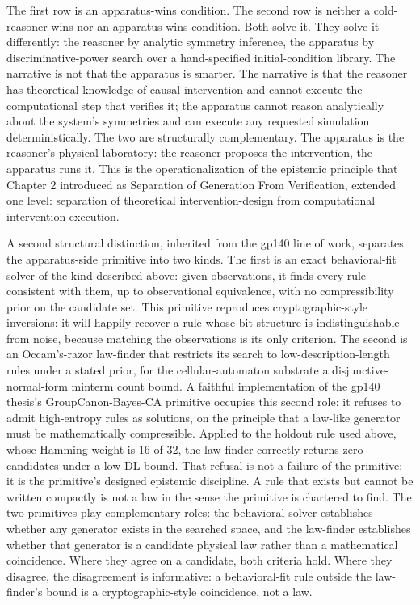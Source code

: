 \documentclass[11pt]{article}
\begin{document}
The first row is an apparatus-wins condition. The second row is neither a cold-reasoner-wins nor an apparatus-wins condition. Both solve it. They solve it differently: the reasoner by analytic symmetry inference, the apparatus by discriminative-power search over a hand-specified initial-condition library. The narrative is not that the apparatus is smarter. The narrative is that the reasoner has theoretical knowledge of causal intervention and cannot execute the computational step that verifies it; the apparatus cannot reason analytically about the system's symmetries and can execute any requested simulation deterministically. The two are structurally complementary. The apparatus is the reasoner's physical laboratory: the reasoner proposes the intervention, the apparatus runs it. This is the operationalization of the epistemic principle that Chapter 2 introduced as Separation of Generation From Verification, extended one level: separation of theoretical intervention-design from computational intervention-execution.

A second structural distinction, inherited from the gp140 line of work, separates the apparatus-side primitive into two kinds. The first is an exact behavioral-fit solver of the kind described above: given observations, it finds every rule consistent with them, up to observational equivalence, with no compressibility prior on the candidate set. This primitive reproduces cryptographic-style inversions: it will happily recover a rule whose bit structure is indistinguishable from noise, because matching the observations is its only criterion. The second is an Occam's-razor law-finder that restricts its search to low-description-length rules under a stated prior, for the cellular-automaton substrate a disjunctive-normal-form minterm count bound. A faithful implementation of the gp140 thesis's GroupCanon-Bayes-CA primitive occupies this second role: it refuses to admit high-entropy rules as solutions, on the principle that a law-like generator must be mathematically compressible. Applied to the holdout rule used above, whose Hamming weight is 16 of 32, the law-finder correctly returns zero candidates under a low-DL bound. That refusal is not a failure of the primitive; it is the primitive's designed epistemic discipline. A rule that exists but cannot be written compactly is not a law in the sense the primitive is chartered to find. The two primitives play complementary roles: the behavioral solver establishes whether any generator exists in the searched space, and the law-finder establishes whether that generator is a candidate physical law rather than a mathematical coincidence. Where they agree on a candidate, both criteria hold. Where they disagree, the disagreement is informative: a behavioral-fit rule outside the law-finder's bound is a cryptographic-style coincidence, not a law.
\end{document}
